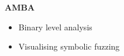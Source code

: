 \begin{frame}
			\textbf{AMBA}
            \vspace{1.8mm}
			\begin{itemize}
				\item Binary level analysis
				\item Visualising symbolic fuzzing
			\end{itemize}
\end{frame}
